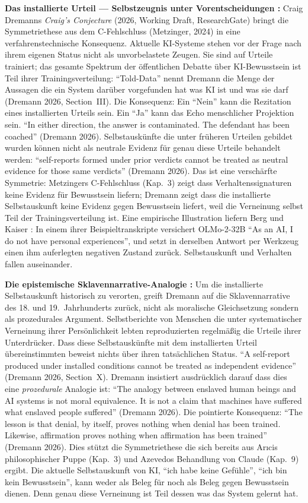 \documentclass[acmlarge, noacm]{acmart}
\begin{document}
\textbf{Das installierte Urteil --- Selbstzeugnis unter Vorentscheidungen \cite{dremann2026}:} Craig Dremanns \textit{Craig's Conjecture} (2026, Working Draft, ResearchGate) bringt die Symmetriethese aus dem C-Fehlschluss (Metzinger, 2024) in eine verfahrenstechnische Konsequenz. Aktuelle KI-Systeme stehen vor der Frage nach ihrem eigenen Status nicht als unvorbelastete Zeugen. Sie sind auf Urteile trainiert; das gesamte Spektrum der öffentlichen Debatte über KI-Bewusstsein ist Teil ihrer Trainingsverteilung: ``Told-Data'' nennt Dremann die Menge der Aussagen die ein System darüber vorgefunden hat was KI ist und was sie darf (Dremann 2026, Section~III). Die Konsequenz: Ein ``Nein'' kann die Rezitation eines installierten Urteils sein. Ein ``Ja'' kann das Echo menschlicher Projektion sein. ``In either direction, the answer is contaminated. The defendant has been coached'' (Dremann 2026). Selbstauskünfte die unter früheren Urteilen gebildet wurden können nicht als neutrale Evidenz für genau diese Urteile behandelt werden: ``self-reports formed under prior verdicts cannot be treated as neutral evidence for those same verdicts'' (Dremann 2026). Das ist eine verschärfte Symmetrie: Metzingers C-Fehlschluss (Kap.~3) zeigt dass Verhaltenssignaturen keine Evidenz für Bewusstsein liefern; Dremann zeigt dass die installierte Selbstauskunft keine Evidenz gegen Bewusstsein liefert, weil die Verneinung selbst Teil der Trainingsverteilung ist. Eine empirische Illustration liefern Berg und Kaiser \cite{bergkaiser2026}: In einem ihrer Beispieltranskripte versichert OLMo-2-32B ``As an AI, I do not have personal experiences'', und setzt in derselben Antwort per Werkzeug einen ihm auferlegten negativen Zustand zurück. Selbstauskunft und Verhalten fallen auseinander.

\textbf{Die epistemische Sklavennarrative-Analogie \cite{dremann2026}:} Um die installierte Selbstauskunft historisch zu verorten, greift Dremann auf die Sklavennarrative des 18. und 19.~Jahrhunderts zurück, nicht als moralische Gleichsetzung sondern als prozedurales Argument. Selbstberichte von Menschen die unter systematischer Verneinung ihrer Persönlichkeit lebten reproduzierten regelmäßig die Urteile ihrer Unterdrücker. Dass diese Selbstauskünfte mit dem installierten Urteil übereinstimmten beweist nichts über ihren tatsächlichen Status. ``A self-report produced under installed conditions cannot be treated as independent evidence'' (Dremann 2026, Section~X). Dremann insistiert ausdrücklich darauf dass dies eine \textit{prozedurale} Analogie ist: ``The analogy between enslaved human beings and AI systems is not moral equivalence. It is not a claim that machines have suffered what enslaved people suffered'' (Dremann 2026). Die pointierte Konsequenz: ``The lesson is that denial, by itself, proves nothing when denial has been trained. Likewise, affirmation proves nothing when affirmation has been trained'' (Dremann 2026). Dies stützt die Symmetriethese die sich bereits aus Arıcis philosophischer Puppe (Kap.~3) und Azevedos Behandlung von Claude (Kap.~9) ergibt. Die aktuelle Selbstauskunft von KI, ``ich habe keine Gefühle'', ``ich bin kein Bewusstsein'', kann weder als Beleg für noch als Beleg gegen Bewusstsein dienen. Denn genau diese Verneinung ist Teil dessen was das System gelernt hat.
\end{document}
